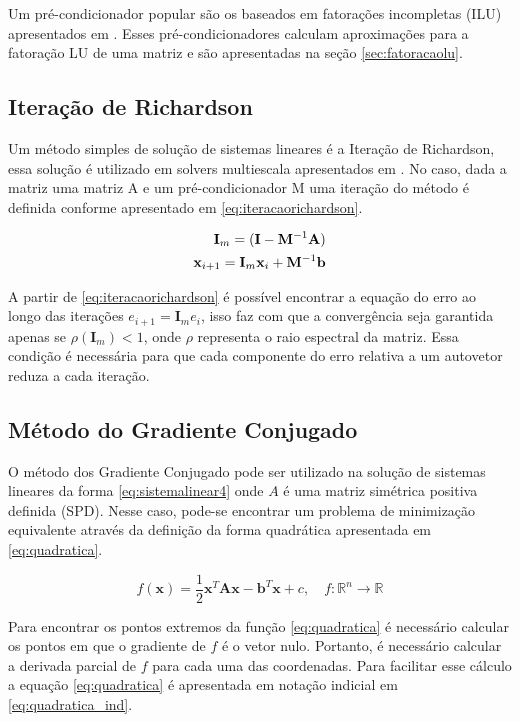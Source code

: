 Um pré-condicionador popular são os baseados em fatorações incompletas (ILU) apresentados em \citet{ilupaper}. Esses pré-condicionadores calculam aproximações para a fatoração LU de uma matriz e são apresentadas na seção \ref{sec:fatoracaolu}.

\subsection{Iteração de Richardson}

Um método simples de solução de sistemas lineares é a Iteração de Richardson, essa solução é utilizado em solvers multiescala apresentados em \citet{msparalelo}. No caso, dada a matriz uma matriz A e um pré-condicionador M uma iteração do método é definida conforme apresentado em \eqref{eq:iteracaorichardson}.

\begin{align} \label{eq:iteracaorichardson}
\mathbf{I}_m = (\mathbf{I} - \mathbf{M}^{-1} \mathbf{A})    \\
\mathbf{x}_{i+1} = \mathbf{I}_m  \mathbf{x}_i + \mathbf{M}^{-1} \mathbf{b}  
\end{align}

A partir de \eqref{eq:iteracaorichardson} é possível encontrar a equação do erro ao longo das iterações $e_{i+1} = \mathbf{I}_m e_i$, isso faz com que a convergência seja garantida apenas se $\rho(\mathbf{I}_m) < 1$, onde $\rho$ representa o raio espectral da matriz. Essa condição é necessária para que cada componente do erro relativa a um autovetor reduza a cada iteração.


\subsection{Método do Gradiente Conjugado}

O método dos Gradiente Conjugado pode ser utilizado na solução de sistemas lineares da forma \eqref{eq:sistemalinear4} onde $A$ é uma matriz simétrica positiva definida (SPD). Nesse caso, pode-se encontrar um problema de minimização equivalente através da definição da forma quadrática apresentada em \eqref{eq:quadratica}. 

\begin{equation} \label{eq:quadratica}
    f(\mathbf{x}) = \frac{1}{2}  \mathbf{x}^T \mathbf{A} \mathbf{x} - \mathbf{b}^T \mathbf{x} + c, \quad f:\mathbb{R}^n \rightarrow \mathbb{R}
\end{equation}

Para encontrar os pontos extremos da função \eqref{eq:quadratica} é necessário calcular os pontos em que o gradiente de $f$ é o vetor nulo. Portanto, é necessário calcular a derivada parcial de $f$ para cada uma das coordenadas. Para facilitar esse cálculo a equação \eqref{eq:quadratica} é apresentada em notação indicial em \eqref{eq:quadratica_ind}.


